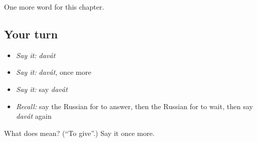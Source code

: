 \begin{grammarlens}[title={What you've built}]
One more word for this chapter.
\end{grammarlens}

\subsection*{Your turn}
\begin{itemize}
\raggedright
  \item \emph{Say it:} \emph{davát}
  \item \emph{Say it:} \emph{davát}, once more
  \item \emph{Say it:} say \emph{davát}
  \item \emph{Recall:} say the Russian for to answer, then the Russian for to wait, then say \emph{davát} again
\end{itemize}

\begin{tcolorbox}[breakable,colback=teal!4,colframe=teal!35!black,title={Before you move on}]
What does  mean? (\textquotedblleft{}To give\textquotedblright{}.) Say it once more.
\end{tcolorbox}
